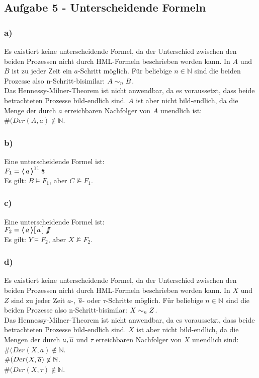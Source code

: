 \subsection*{Aufgabe 5 - Unterscheidende Formeln}

\subsubsection*{a)}

Es existiert keine unterscheidende Formel, da der Unterschied zwischen den beiden Prozessen nicht durch HML-Formeln beschrieben werden kann.
In $A$ und $B$ ist zu jeder Zeit ein $a$-Schritt möglich. Für beliebige $n \in \mathbb{N}$ sind die beiden Prozesse also n-Schritt-bisimilar: $ A \sim_n B$. \\
Das Hennessy-Milner-Theorem ist nicht anwendbar, da es voraussetzt, dass beide betrachteten Prozesse bild-endlich sind.
 $A$ ist aber nicht bild-endlich, da die Menge der durch $a$ erreichbaren Nachfolger von $A$ unendlich ist:
$ \#(Der(A,a) \not\in \mathbb{N}$.


\subsubsection*{b)}

Eine unterscheidende Formel ist: \\
$ F_1 = \boldsymbol{\langle} \, a \, \boldsymbol{\rangle}^{11} \mathop{\textit{t}\!\textit{t}}$ \\
Es gilt:
$ B \models F_1$, aber $C \not\models F_1 $.\\


\subsubsection*{c)}

Eine unterscheidende Formel ist: \\
$ F_2 = \boldsymbol{\langle} \, a \, \boldsymbol{\rangle} \boldsymbol{[} \, a \, \boldsymbol{]}\,\mathop{\textit{f}\!\textit{f}}$ \\
Es gilt:
$ Y \models F_2$, aber $X \not\models F_2 $.\\

\subsubsection*{d)}

Es existiert keine unterscheidende Formel, da der Unterschied zwischen den beiden Prozessen nicht durch HML-Formeln beschrieben werden kann.
In $X$ und $Z$ sind zu jeder Zeit $a$-, $\Out{a}{}$- oder $\tau$-Schritte möglich. Für beliebige $n \in \mathbb{N}$ sind die beiden Prozesse also n-Schritt-bisimilar: $ X \sim_n Z$. \\
Das Hennessy-Milner-Theorem ist nicht anwendbar, da es voraussetzt, dass beide betrachteten Prozesse bild-endlich sind.
 $X$ ist aber nicht bild-endlich, da die Mengen der durch $a, \Out{a}{}$ und $\tau$ erreichbaren Nachfolger von $X$ unendlich sind: \\
$ \#(Der(X,a) \not\in \mathbb{N}$. \\
$ \#(Der(X,\Out{a}{}) \not\in \mathbb{N}$. \\
$ \#(Der(X,\tau) \not\in \mathbb{N}$.
